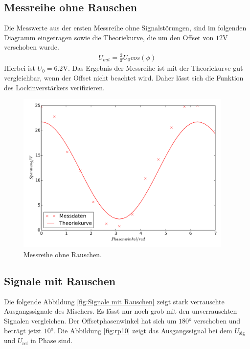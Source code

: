 \subsection{Messreihe ohne Rauschen}
\label{sec:Messreihe ohne Rauschen}
Die Messwerte aus der ersten Messreihe ohne Signalstörungen, sind im folgenden
Diagramm eingetragen sowie die Theoriekurve, die um den Offset von $12\si{\volt}$
verschoben wurde.
\begin{align*}
U_{out}=\frac{2}{\pi}U_0cos(\phi)
\end{align*}
 Hierbei ist $U_0=6.2\si{\volt}$. Das Ergebnis der Messreihe ist
mit der Theoriekurve gut vergleichbar, wenn der Offset nicht beachtet wird.
Daher lässt sich die Funktion des Lockinverstärkers verifizieren.
\begin{figure}
  \centering
  \includegraphics[height=8cm]{or_signal.pdf}
  \caption{Messreihe ohne Rauschen.}
  \label{fig:Mor}
\end{figure}

\subsection{Signale mit Rauschen}
\label{sec:Signale mit Rauschen}
Die folgende Abbildung \ref{fig:Signale mit Rauschen} zeigt stark verrauschte
Ausgangssignale des Mischers. Es lässt nur noch grob mit den unverrauschten
Signalen vergleichen. Der Offsetphasenwinkel hat sich um $180°$ verschoben und beträgt jetzt $10°$.
Die Abbildung \ref{fig:rp10} zeigt das Ausgangssignal bei dem $U_\text{sig}$ und
$U_\text{ref}$ in Phase sind.

